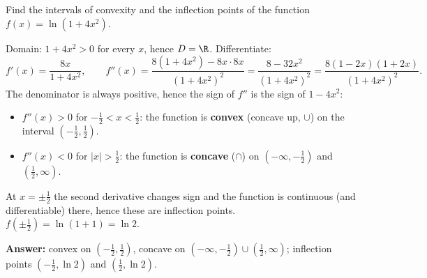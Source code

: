 
\begin{question}
Find the intervals of convexity and the inflection points of the function $f(x)=\ln(1+4x^2)$.
\end{question}

\begin{solution}
Domain: $1+4x^2>0$ for every $x$, hence $D=\R$. Differentiate:
\[ f'(x)=\frac{8x}{1+4x^2},\qquad
f''(x)=\frac{8(1+4x^2)-8x\cdot 8x}{(1+4x^2)^2}=\frac{8-32x^2}{(1+4x^2)^2}=\frac{8(1-2x)(1+2x)}{(1+4x^2)^2}. \]
The denominator is always positive, hence the sign of $f''$ is the sign of $1-4x^2$:
\begin{itemize}
  \item $f''(x)>0$ for $-\frac12<x<\frac12$: the function is \textbf{convex} (concave up, $\cup$) on the interval $\left(-\frac12,\frac12\right)$.
  \item $f''(x)<0$ for $|x|>\frac12$: the function is \textbf{concave} ($\cap$) on $\left(-\infty,-\frac12\right)$ and $\left(\frac12,\infty\right)$.
\end{itemize}
At $x=\pm\frac12$ the second derivative changes sign and the function is continuous (and differentiable) there, hence these are inflection points. $f(\pm\tfrac12)=\ln(1+1)=\ln 2$.

\textbf{Answer:} convex on $\left(-\frac12,\frac12\right)$, concave on $\left(-\infty,-\frac12\right)\cup\left(\frac12,\infty\right)$; inflection points $\left(-\frac12,\ln 2\right)$ and $\left(\frac12,\ln 2\right)$.
\end{solution}
